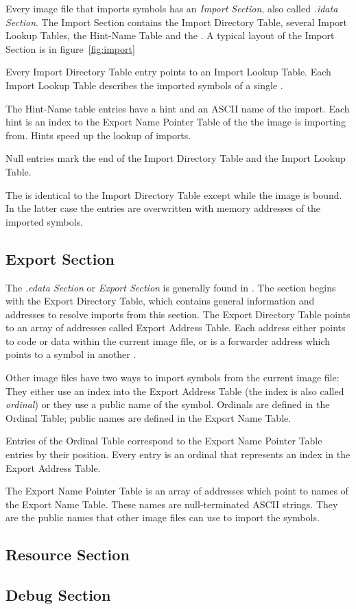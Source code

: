 Every image file that imports symbols has an \emph{Import Section}, also called \emph{.idata Section}.
The Import Section contains the Import Directory Table, several Import Lookup Tables, the Hint-Name Table and the \IAT{}. A typical layout of the Import Section is in figure~\ref{fig:import}

Every Import Directory Table entry points to an Import Lookup Table. Each Import Lookup Table describes the imported symbols of a single \DLL{}.

The Hint-Name table entries have a hint and an ASCII name of the import. Each hint is an index to the Export Name Pointer Table of the \DLL{} the image is importing from. Hints speed up the lookup of imports.

Null entries mark the end of the Import Directory Table and the Import Lookup Table.

The \IAT{} is identical to the Import Directory Table except while the image is bound. In the latter case the \IAT{} entries are overwritten with memory addresses of the imported symbols.

\subsection*{Export Section}

The \emph{.edata Section} or \emph{Export Section} is generally found in . The section begins with the Export Directory Table, which contains general information and addresses to resolve imports from this section. The Export Directory Table points to an array of addresses called Export Address Table. Each address either points to code or data within the current image file, or is a forwarder address which points to a symbol in another \DLL{}. 

Other image files have two ways to import symbols from the current image file: They either use an index into the Export Address Table (the index is also called \emph{ordinal}) or they use a public name of the symbol. Ordinals are defined in the Ordinal Table; public names are defined in the Export Name Table.

Entries of the Ordinal Table correspond to the Export Name Pointer Table entries by their position. Every entry is an ordinal that represents an index in the Export Address Table.

The Export Name Pointer Table is an array of addresses which point to names of the Export Name Table. These names are null-terminated ASCII strings. They are the public names that other image files can use to import the symbols.

\subsection*{Resource Section}

\subsection*{Debug Section}
